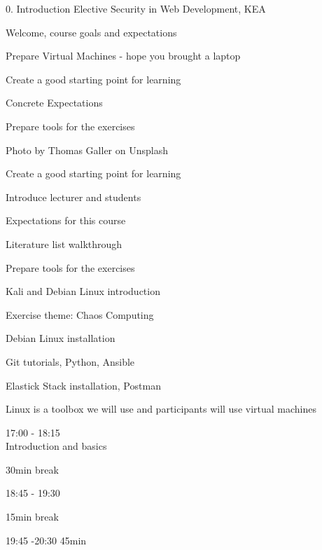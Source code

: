 \documentclass[Screen16to9,17pt]{foils}
\begin{document}
\mytitlepage
{0. Introduction}
{Elective Security in Web Development, KEA}

\hlkprofiluk



\begin{list2}
\item Welcome, course goals and expectations
\item Prepare Virtual Machines - hope you brought a laptop
\item Create a good starting point for learning
\item Concrete Expectations
\item Prepare tools for the exercises
\end{list2}

Photo by Thomas Galler on Unsplash


\begin{list2}
\item Create a good starting point for learning
\item Introduce lecturer and students
\item Expectations for this course
\item Literature list walkthrough
\item Prepare tools for the exercises
\item Kali and Debian Linux introduction
\end{list2}

Exercise theme: Chaos Computing
\begin{list2}
\item Debian Linux installation
\item Git tutorials, Python, Ansible
\item Elastick Stack installation, Postman
\end{list2}
Linux is a toolbox we will use and participants will use virtual machines



\begin{list2}
\item 17:00 - 18:15\\
Introduction and basics
\item 30min break\\

\item 18:45 - 19:30\\

\item 15min break\\

\item 19:45 -20:30 45min\\
\end{list2}
\end{document}
